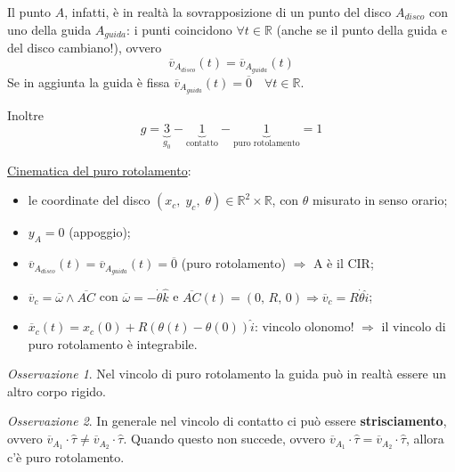 \documentclass{book}
\theoremstyle{plain}
\theoremstyle{plain}
\theoremstyle{plain}
\theoremstyle{plain}
\theoremstyle{plain}
\theoremstyle{definition}
\theoremstyle{remark}
\newtheorem*{oss}{Osservazione}
\theoremstyle{definition}
\begin{document}
\noindent Il punto $A$, infatti, è in realtà la sovrapposizione di un punto del disco $A_{disco}$ con uno della guida $A_{guida}$: i punti coincidono $\forall t \in \mathbb{R}$ (anche se il punto della guida e del disco cambiano!), ovvero
\begin{displaymath}
\boxed{
    \overline{v}_{A_{disco}}(t)=\overline{v}_{A_{guida}}(t)
    }
\end{displaymath}
Se in aggiunta la guida è fissa $\overline{v}_{A_{guida}}(t)=\overline{0} \quad \forall t \in \mathbb{R}$.

\noindent Inoltre
\begin{displaymath}
    g=\underbrace{3}_{g_0}-\underbrace{1}_{\text{contatto}}-\underbrace{1}_{\text{puro rotolamento}}=1
\end{displaymath}

\noindent \underline{Cinematica del puro rotolamento}:
\begin{itemize}
    \item le coordinate del disco $(x_c,\;y_c,\;\theta) \in \mathbb{R}^2 \times \mathbb{R}$, con $\theta$ misurato in senso orario;
    \item $y_A=0$ (appoggio);
    \item $\overline{v}_{A_{disco}}(t)=\overline{v}_{A_{guida}}(t)=\overline{0}$ (puro rotolamento) $\Longrightarrow$ A è il CIR;
    \item $\overline{v}_c=\overline{\omega} \wedge \overline{AC}$ con $\overline{\omega}= - \dot{\theta}\hat{k}$ e $\overline{AC}(t)=(0,\,R,\,0) \Longrightarrow \overline{v}_c = R\dot{\theta}\hat{i}$;
    \item $\overline{x}_c(t)={x}_c(0)+R\left(\theta(t)-\theta(0)\right)\hat{i}$: vincolo olonomo! $\Longrightarrow$ il vincolo di puro rotolamento è integrabile.
\end{itemize}

\begin{oss}
    Nel vincolo di puro rotolamento la guida può in realtà essere un altro corpo rigido. 
\end{oss}

\begin{oss}
    In generale nel vincolo di contatto ci può essere \textbf{strisciamento}, ovvero  $\overline{v}_{A_1} \cdot \hat{\tau} \neq \overline{v}_{A_2} \cdot \hat{\tau}$. Quando questo non succede, ovvero $\overline{v}_{A_1} \cdot \hat{\tau} = \overline{v}_{A_2} \cdot \hat{\tau}$, allora c'è puro rotolamento.
\end{oss}
\end{document}
